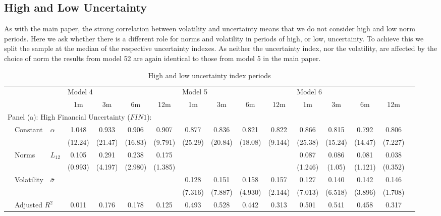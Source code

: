 \documentclass{article}
\begin{document}
\subsection{High and Low Uncertainty}

As with the main paper, the strong correlation between volatility and uncertainty means that we do not consider high and low norm periods. Here we ask whether there is a different role for norms and volatility in periods of high, or low, uncertainty. To achieve this we split the sample at the median of the respective uncertainty indexes. As neither the uncertainty index, nor the volatility, are affected by the choice of norm the results from model 52 are again identical to those from model 5 in the main paper.

\begin{sidewaystable}
    \begin{center}
        \caption{High and low uncertainty index periods}
        \label{tab:reg42hl}
        \begin{small}
        \begin{tabular}{ll l c c c c c c c c c c c c c}
        \hline
             &&& \multicolumn{4}{l}{Model 4} & \multicolumn{4}{l}{Model 5}& \multicolumn{4}{l}{Model 6}\\
             &&& 1m & 3m & 6m & 12m & 1m & 3m & 6m & 12m & 1m & 3m & 6m & 12m\\
             \hline
             \multicolumn{12}{l}{Panel (a): High Financial Uncertainty ($FIN1$): }\\
             & Constant & $\alpha$ & 1.048&0.933&0.906&0.907&0.877&0.836&0.821&0.822&0.866&0.815&0.792&0.806\\
             &&&(12.24)&(21.47)&(16.83)&(9.791)&(25.29)&(20.84)&(18.08)&(9.144)&(25.38)&(15.24)&(14.47)&(7.227)\\
             & Norms & $L_{12}$&0.105&0.291&0.238&0.175&&&&&0.087&0.086&0.081&0.038\\
             &&&(0.993)&(4.197)&(2.980)&(1.385)&&&&&(1.246)&(1.05)&(1.121)&(0.352)\\
             & Volatility & $\bar{\sigma}$&&&&&0.128&0.151&0.158&0.157&0.127&0.140&0.142&0.146\\
             &&&&&&&(7.316)&(7.887)&(4.930)&(2.144)&(7.013)&(6.518)&(3.896)&(1.708)\\
             & \multicolumn{2}{l}{Adjusted $R^2$}&0.011&0.176&0.178&0.125&0.493&0.528&0.442&0.313&0.501&0.541&0.458&0.317\\


\end{tabular}
\end{small}
\end{center}
\end{sidewaystable}
\end{document}

